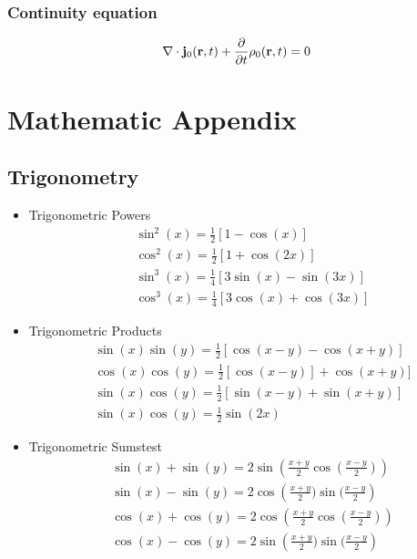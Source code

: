 \documentclass[a4paper, fontsize=8pt, landscape, DIV=1]{scrartcl}
\begin{document}
\begin{multicols*}{4}
  \subsubsection{Continuity equation}
  \[\nabla\cdot\mathbf{j}_0(\mathbf{r},t) + \frac{\partial}{\partial t}\rho_0(\mathbf{r},t) = 0\]


  \vfill\null
  \pagebreak
  \section{Mathematic Appendix}
  \subsection{Trigonometry}
  \begin{itemize}
    \item Trigonometric Powers
    {\small\begin{align*}
      & \sin^2(x) = \frac{1}{2}[1-\cos(x)] \\
      & \cos^2(x) = \frac{1}{2}[1+\cos(2x)] \\
      & \sin^3(x) = \frac{1}{4}[3\sin(x)-\sin(3x)] \\
      & \cos^3(x) = \frac{1}{4}[3\cos(x) + \cos(3x)]
    \end{align*}}%

    \item Trigonometric Products
    {\small\begin{align*}
      & \sin(x)\sin(y) = \frac{1}{2}[\cos(x-y) - \cos(x+y)] \\
      &\cos(x)\cos(y) = \frac{1}{2}[\cos(x-y)] + \cos(x+y)] \\
      & \sin(x)\cos(y) = \frac{1}{2}[\sin(x-y) + \sin(x+y)] \\
      &\sin(x)\cos(y) = \frac{1}{2}\sin(2x)
    \end{align*}}%

    \item Trigonometric Sumstest
    {\small\begin{align*}
      & \sin(x) + \sin(y) = 2\sin\left(\frac{x+y}{2}\cos(\frac{x-y}{2})\right)\\
      & \sin(x)-\sin(y) = 2\cos\left(\frac{x+y}{2})\sin(\frac{x-y}{2}\right) \\
      & \cos(x) + \cos(y) = 2\cos\left(\frac{x+y}{2}\cos(\frac{x-y}{2})\right)\\
      & \cos(x)-\cos(y) = 2\sin\left(\frac{x+y}{2})\sin(\frac{x-y}{2}\right)
    \end{align*}}%


\end{itemize}
\end{multicols*}
\end{document}
